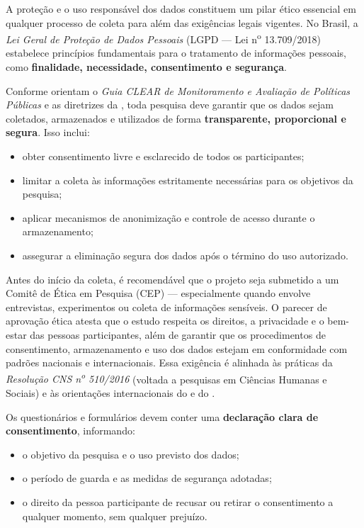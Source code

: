 \documentclass[12pt, a4paper, openany]{book}
\begin{document}
A prote\c{c}\~ao e o uso respons\'avel dos dados constituem um pilar \'etico essencial em qualquer processo de coleta para al\'em das exig\^encias legais vigentes. No Brasil, a \textit{Lei Geral de Prote\c{c}\~ao de Dados Pessoais} (LGPD --- Lei n\textsuperscript{o} 13.709/2018) estabelece princ\'ipios fundamentais para o tratamento de informa\c{c}\~oes pessoais, como \textbf{finalidade, necessidade, consentimento e seguran\c{c}a}.

Conforme orientam o \textit{Guia CLEAR de Monitoramento e Avalia\c{c}\~ao de Pol\'iticas P\'ublicas} \citep{fgvclear2025mea} e as diretrizes da \citet{oecd2022data}, toda pesquisa deve garantir que os dados sejam coletados, armazenados e utilizados de forma \textbf{transparente, proporcional e segura}. Isso inclui:

\begin{itemize}
\item obter consentimento livre e esclarecido de todos os participantes;
\item limitar a coleta \`as informa\c{c}\~oes estritamente necess\'arias para os objetivos da pesquisa;
\item aplicar mecanismos de anonimiza\c{c}\~ao e controle de acesso durante o armazenamento;
\item assegurar a elimina\c{c}\~ao segura dos dados ap\'os o t\'ermino do uso autorizado.
\end{itemize}

Antes do in\'icio da coleta, \'e recomend\'avel que o projeto seja submetido a um Comit\^e de \'Etica em Pesquisa (CEP) --- especialmente quando envolve entrevistas, experimentos ou coleta de informa\c{c}\~oes sens\'iveis. O parecer de aprova\c{c}\~ao \'etica atesta que o estudo respeita os direitos, a privacidade e o bem-estar das pessoas participantes, al\'em de garantir que os procedimentos de consentimento, armazenamento e uso dos dados estejam em conformidade com padr\~oes nacionais e internacionais. Essa exig\^encia \'e alinhada \`as pr\'aticas da \textit{Resolu\c{c}\~ao CNS n\textsuperscript{o} 510/2016} (voltada a pesquisas em Ci\^encias Humanas e Sociais) e \`as orienta\c{c}\~oes internacionais do \citet{worldbank2021data} e do \citet{jpal2020practical}.

Os question\'arios e formul\'arios devem conter uma \textbf{declara\c{c}\~ao clara de consentimento}, informando:

\begin{itemize}
\item o objetivo da pesquisa e o uso previsto dos dados;
\item o per\'iodo de guarda e as medidas de seguran\c{c}a adotadas;
\item o direito da pessoa participante de recusar ou retirar o consentimento a qualquer momento, sem qualquer preju\'izo.
\end{itemize}
\end{document}
